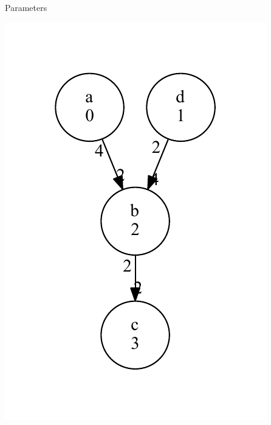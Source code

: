 \begin{DoxyParams}{Parameters}
\begin{DoxyImage}
\includegraphics[width=\textwidth,height=\textheight/2,keepaspectratio=true]{dot_SDFG_example}
\end{DoxyImage}
 

\end{DoxyParams}
